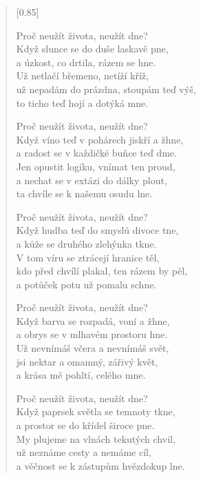 \documentclass[12pt, a4paper]{article}
\begin{document}
\begin{verse}[0.85\textwidth]

Proč neužít života, neužít dne? \\
Když slunce se do duše laskavě pne, \\
a úzkost, co drtila, rázem se hne. \\
Už netlačí břemeno, netíží kříž, \\
už nepadám do prázdna, stoupám teď výš, \\
to ticho teď hojí a dotýká mne.

\vspace{1em}
\newpage

Proč neužít života, neužít dne? \\
Když víno teď v pohárech jiskří a žhne, \\
a radost se v každičké buňce teď dme. \\
Jen opustit logiku, vnímat ten proud, \\
a nechat se v extázi do dálky plout, \\
ta chvíle se k našemu osudu lne.

\vspace{1em}


Proč neužít života, neužít dne? \\
Když hudba teď do smyslů divoce tne, \\
a kůže se druhého zlehýnka tkne. \\
V tom víru se ztrácejí hranice těl, \\
kdo před chvílí plakal, ten rázem by pěl, \\
a potůček potu už pomalu schne.

\vspace{1em}

Proč neužít života, neužít dne? \\
Když barva se rozpadá, voní a žhne, \\
a obrys se v mlhavém prostoru hne. \\
Už nevnímáš včera a nevnímáš svět, \\
jsi nektar a omamný, zářivý květ, \\
a krása mě pohltí, celého mne.

\vspace{1em}

Proč neužít života, neužít dne? \\
Když paprsek světla se temnoty tkne, \\
a prostor se do křídel široce pne. \\
My plujeme na vlnách tekutých chvil, \\
už neznáme cesty a nemáme cíl, \\
a věčnost se k zástupům hvězdokup lne.


\end{verse}
\end{document}
